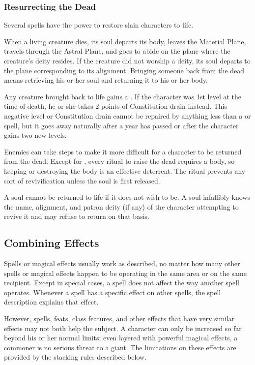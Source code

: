 \subsubsection{Resurrecting the Dead}\label{Resurrecting the Dead}

Several spells have the power to restore slain characters to life.

When a living creature dies, its soul departs its body, leaves the Material Plane, travels through the Astral Plane, and goes to abide on the plane where the creature's deity resides. If the creature did not worship a deity, its soul departs to the plane corresponding to its alignment. Bringing someone back from the dead means retrieving his or her soul and returning it to his or her body.

 Any creature brought back to life gains a \negativelevel. If the character was 1st level at the time of death, he or she takes 2 points of Constitution drain instead. This negative level or Constitution drain cannot be repaired by anything less than a  or  spell, but it goes away naturally after a year has passed or after the character gains two new levels.

 Enemies can take steps to make it more difficult for a character to be returned from the dead. Except for , every ritual to raise the dead requires a body, so keeping or destroying the body is an effective deterrent. The  ritual prevents any sort of revivification unless the soul is first released.

 A soul cannot be returned to life if it does not wish to be. A soul infallibly knows the name, alignment, and patron deity (if any) of the character attempting to revive it and may refuse to return on that basis.


\subsection{Combining Effects}
Spells or magical effects usually work as described, no matter how many other spells or magical effects happen to be operating in the same area or on the same recipient. Except in special cases, a spell does not affect the way another spell operates. Whenever a spell has a specific effect on other spells, the spell description explains that effect.

However, spells, feats, class features, and other effects that have very similar effects may not both help the subject. A character can only be increased so far beyond his or her normal limits; even layered with powerful magical effects, a commoner is no serious threat to a giant. The limitations on these effects are provided by the stacking rules described below.

